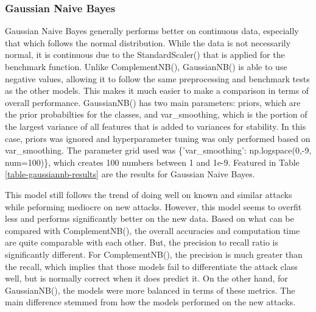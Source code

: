 \subsubsection{Gaussian Naive Bayes}
Gaussian Naive Bayes generally performs better on continuous data, especially that which follows the normal distribution. While the data is not necessarily normal, it is continuous due to the StandardScaler() that is applied for the benchmark function. Unlike ComplementNB(), GaussianNB() is able to use negative values, allowing it to follow the same preprocessing and benchmark tests as the other models. This makes it much easier to make a comparison in terms of overall performance. GaussianNB() has two main parameters: priors, which are the prior probabilties for the classes, and var\_smoothing, which is the portion of the largest variance of all features that is added to variances for stability. In this case, priors was ignored and hyperparameter tuning was only performed based on var\_smoothing. The parameter grid used was \{'var\_smoothing': np.logspace(0,-9, num=100)\}, which creates 100 numbers between 1 and 1e-9. Featured in Table \ref{table-gaussiannb-results} are the results for Gaussian Naive Bayes.



This model still follows the trend of doing well on known and similar attacks while peforming mediocre on new attacks. However, this model seems to overfit less and performs significantly better on the new data. Based on what can be compared with ComplementNB(), the overall accuracies and computation time are quite comparable with each other. But, the precision to recall ratio is significantly different. For ComplementNB(), the precision is much greater than the recall, which implies that those models fail to differentiate the attack class well, but is normally correct when it does predict it. On the other hand, for GaussianNB(), the models were more balanced in terms of these metrics. The main difference stemmed from how the models performed on the new attacks.

